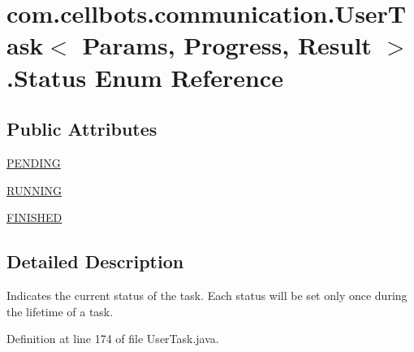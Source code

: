\hypertarget{enumcom_1_1cellbots_1_1communication_1_1_user_task_3_01_params_00_01_progress_00_01_result_01_4_1_1_status}{\section{com.\-cellbots.\-communication.\-User\-Task$<$ Params, Progress, Result $>$.Status Enum Reference}
\label{enumcom_1_1cellbots_1_1communication_1_1_user_task_3_01_params_00_01_progress_00_01_result_01_4_1_1_status}
}
\subsection*{Public Attributes}
\begin{DoxyCompactItemize}
\item 
\hyperlink{enumcom_1_1cellbots_1_1communication_1_1_user_task_3_01_params_00_01_progress_00_01_result_01_4_1_1_status_a5a5867ebfc48af8653eb686810396a99}{P\-E\-N\-D\-I\-N\-G}
\item 
\hyperlink{enumcom_1_1cellbots_1_1communication_1_1_user_task_3_01_params_00_01_progress_00_01_result_01_4_1_1_status_a95a8249e4f89b48379f521929ef3eea6}{R\-U\-N\-N\-I\-N\-G}
\item 
\hyperlink{enumcom_1_1cellbots_1_1communication_1_1_user_task_3_01_params_00_01_progress_00_01_result_01_4_1_1_status_aec5ddfb5758dd8c63de0691395a0e4d0}{F\-I\-N\-I\-S\-H\-E\-D}
\end{DoxyCompactItemize}


\subsection{Detailed Description}
Indicates the current status of the task. Each status will be set only once during the lifetime of a task. 

Definition at line 174 of file User\-Task.\-java.



